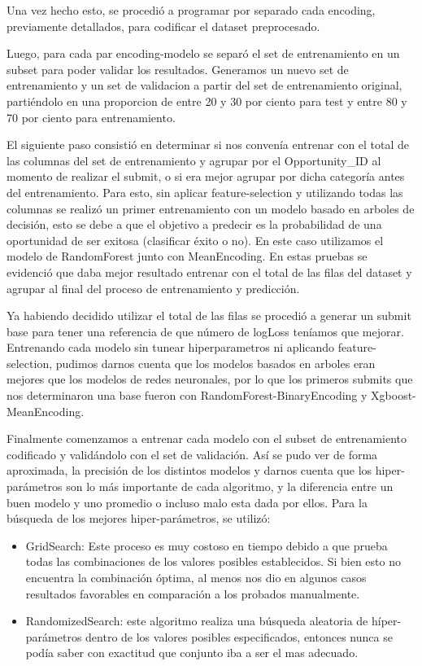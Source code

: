 \documentclass[12pt,a4paper]{article}
\begin{document}
Una vez hecho esto, se procedió a programar por separado cada encoding, previamente detallados, para codificar el dataset preprocesado. \newline

Luego, para cada par encoding-modelo se separó el set de entrenamiento en un subset para poder validar los resultados. Generamos un nuevo set de entrenamiento y un set de validacion a partir del set de entrenamiento original, partiéndolo en una proporcion de entre 20 y 30 por ciento para test y entre 80 y 70 por ciento para entrenamiento.\newline

El siguiente paso consistió en determinar si nos convenía entrenar con el total de las columnas del set de entrenamiento y agrupar por el Opportunity\_ID al momento de realizar el submit, o si era mejor agrupar por dicha categoría antes del entrenamiento. Para esto, sin aplicar feature-selection y utilizando todas las columnas se realizó un primer entrenamiento con un modelo basado en arboles de decisión, esto se debe a que el objetivo a predecir es la probabilidad de una oportunidad de ser exitosa (clasificar éxito o no). En este caso utilizamos el modelo de RandomForest junto con MeanEncoding. En estas pruebas se evidenció que daba mejor resultado entrenar con el total de las filas del dataset y agrupar al final del proceso de entrenamiento y predicción.\newline

Ya habiendo decidido utilizar el total de las filas se procedió a generar un submit base para tener una referencia de que número de logLoss teníamos que mejorar. Entrenando cada modelo sin tunear hiperparametros ni aplicando feature-selection, pudimos darnos cuenta que los modelos basados en arboles eran mejores que los modelos de redes neuronales, por lo que los primeros submits que nos determinaron una base fueron con
RandomForest-BinaryEncoding y Xgboost-MeanEncoding.
\newline


Finalmente comenzamos a entrenar cada modelo con el subset de entrenamiento codificado y validándolo con el set de validación. Así se pudo ver de forma aproximada, la precisión de los distintos modelos y darnos cuenta que los hiper-parámetros son lo más importante de cada algoritmo, y la diferencia entre un buen modelo y uno promedio o incluso malo esta dada por ellos.
Para la búsqueda de los mejores hiper-parámetros, se utilizó:

\begin{itemize}
    \item GridSearch: Este proceso es muy costoso en tiempo debido a que prueba todas las combinaciones de los valores posibles establecidos. Si bien esto no encuentra la combinación óptima, al menos nos dio en algunos casos resultados favorables en comparación a los probados manualmente.
    
    \item RandomizedSearch: este algoritmo realiza una búsqueda aleatoria de híper-parámetros dentro de los valores posibles especificados, entonces nunca se podía saber con exactitud que conjunto iba a ser el mas adecuado.

\end{itemize}
\end{document}
